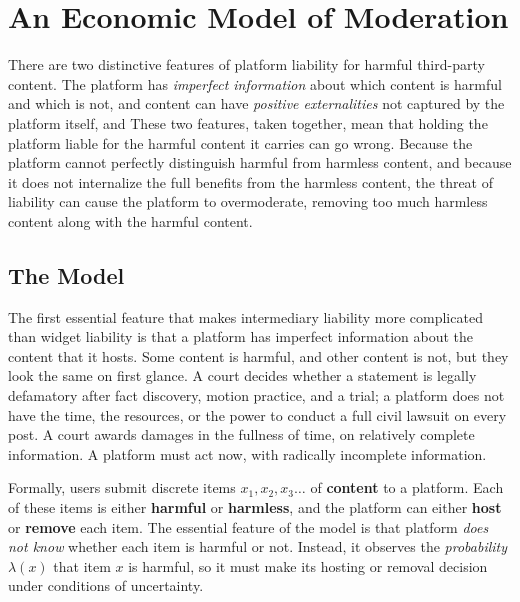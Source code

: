 \newcommand{\ms}{M_s}
\renewcommand{\mp}{M_p}
\newcommand{\mpsl}{M_{p \text{ (SL)}}}
\newcommand{\mpi}{M_{p \text{ (I)}}}

\newcommand{\xmax}{x_{\text{max}}}
\newcommand{\xbi}{\mpi}
\newcommand{\xsl}{\mpsl}
\newcommand{\xsubi}{x_{\text{I}}^p}
\newcommand{\defterm}[1]{\textbf{#1}}



\section{An Economic Model of Moderation}
\label{sec:model}

There are two distinctive features of platform liability for harmful third-party content. The platform has \emph{imperfect information} about which content is harmful and which is not, and  content can have \emph{positive externalities} not captured by the platform itself, and  These two features, taken together, mean that holding the platform liable for the harmful content it carries can go wrong. Because the platform cannot perfectly distinguish harmful from harmless content, and because it does not internalize the full benefits from the harmless content, the threat of liability can cause the platform to overmoderate, removing too much harmless content along with the harmful content.

\subsection{The Model}

The first essential feature that makes intermediary liability more complicated than widget liability is that a platform has imperfect information about the content that it hosts. Some content is harmful, and other content is not, but they look the same on first glance. A court decides whether a statement is legally defamatory after fact discovery, motion practice, and a trial; a platform does not have the time, the resources, or the power to conduct a full civil lawsuit on every post. A court awards damages in the fullness of time, on relatively complete information. A platform must act now, with radically incomplete information. 

Formally, users submit discrete items $x_1, x_2, x_3 \ldots$ of \defterm{content} to a platform. Each of these items is either \defterm{harmful} or \defterm{harmless}, and the platform can either \defterm{host} or \defterm{remove} each item. The essential feature of the model is that platform \emph{does not know} whether each item is harmful or not. Instead, it observes the \emph{probability} $\lambda(x)$ that item $x$ is harmful, so it must make its hosting or removal decision under conditions of uncertainty.

